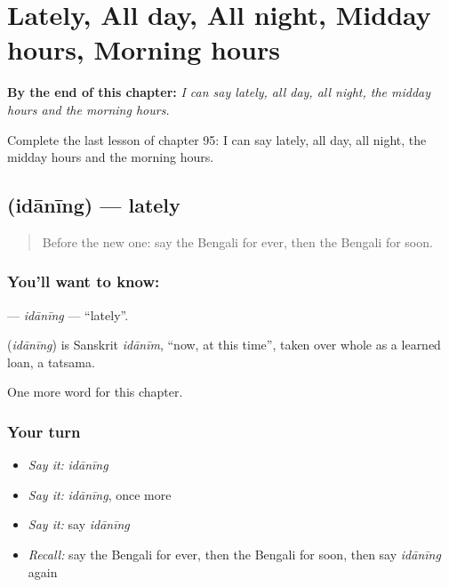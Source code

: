 
\chapter{Lately, All day, All night, Midday hours, Morning hours}
\label{ch:bn-lately-all-day-all-night-midday-hours-morning-hours}

\begin{chapteropening}
\textbf{By the end of this chapter:} \emph{I can say lately, all day, all night, the midday hours and the morning hours.}

Complete the last lesson of chapter 95: I can say lately, all day, all night, the midday hours and the morning hours.
\end{chapteropening}

\section[\texorpdfstring{\bn{ইদানীং} (idānīng)}{ইদানীং (idānīng)}]{ (idānīng) — lately}

\label{lesson:BN-C95-idaning}



\begin{quote}
Before the new one: say the Bengali for ever, then the Bengali for soon.
\end{quote}

\subsection*{You'll want to know: }
\textbf{} — \emph{idānīng} — \textquotedblleft{}lately\textquotedblright{}.

\begin{cousinweb}
\textbf{} (\emph{idānīng}) is Sanskrit \emph{idānīm}, \textquotedblleft{}now, at this time\textquotedblright{}, taken over whole as a learned loan, a tatsama.
\end{cousinweb}

\begin{grammarlens}[title={What you've built}]
One more word for this chapter.
\end{grammarlens}

\subsection*{Your turn}
\begin{itemize}
\raggedright
  \item \emph{Say it:} \emph{idānīng}
  \item \emph{Say it:} \emph{idānīng}, once more
  \item \emph{Say it:} say \emph{idānīng}
  \item \emph{Recall:} say the Bengali for ever, then the Bengali for soon, then say \emph{idānīng} again
\end{itemize}

